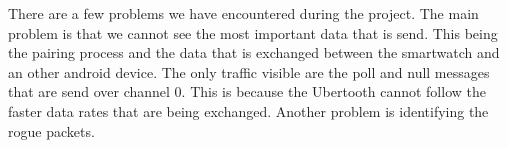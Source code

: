 \label{subsec:problems}
There are a few problems we have encountered during the project. The main problem is that we cannot see the most important data that is send. This being the pairing process and the data that is exchanged between the smartwatch and an other android device. The only traffic visible are the poll and null messages that are send over channel 0. This is because the Ubertooth cannot follow the faster data rates that are being exchanged. Another problem  is identifying the rogue packets.  